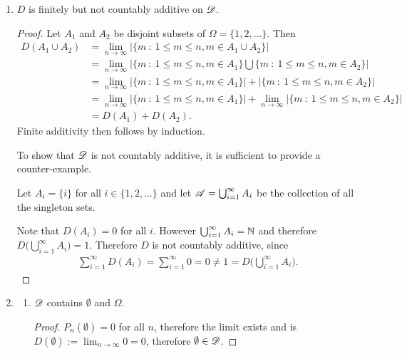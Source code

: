 \begin{enumerate}
  \begin{enumerate}[label=(\alph*)]

  \item
    \begin{claim*}
      $D$ is finitely but not countably additive on $\mathscr D$.
    \end{claim*}
    \begin{proof}
      Let $A_1$ and $A_2$ be disjoint subsets of $\Omega = \{1, 2, \ldots\}$. Then
      \begin{align*}
        D(A_1 \cup A_2)
        &= \lim_{n\to\infty} \big|\big\{m ~:~ 1 \leq m \leq n, m \in A_1 \cup A_2 \big\}\big| \\
        &= \lim_{n\to\infty} \big|\big\{m ~:~ 1 \leq m \leq n, m \in A_1 \big\} \bigcup \big\{m ~:~ 1 \leq m \leq n, m \in A_2 \big\}\big|\\
        &= \lim_{n\to\infty} \big|\big\{m ~:~ 1 \leq m \leq n, m \in A_1 \big\}\big| + \big|\big\{m ~:~ 1 \leq m \leq n, m \in A_2 \big\}\big| \\
        &= \lim_{n\to\infty} \big|\big\{m ~:~ 1 \leq m \leq n, m \in A_1 \big\}\big| + \lim_{n\to\infty} \big|\big\{m ~:~ 1 \leq m \leq n, m \in A_2 \big\}\big| \\
        &= D(A_1) + D(A_2).
      \end{align*}
      Finite additivity then follows by induction.

      To show that $\mathscr D$ is not countably additive, it is sufficient to provide a counter-example.

      Let $A_i = \{i\}$ for all $i \in \{1, 2, \ldots\}$ and let $\mathscr A = \bigcup_{i=1}^\infty A_i$ be the collection of all the singleton sets.

      Note that $D(A_i) = 0$ for all $i$. However $\bigcup_{i=1}^\infty A_i = \mathbb{N}$ and
      therefore $D\big(\bigcup_{i=1}^\infty A_i\big) = 1$. Therefore $D$ is not countably additive, since
      \begin{align*}
        \sum_{i=1}^\infty D(A_i) = \sum_{i=1}^\infty 0 = 0 \neq 1 = D\big(\bigcup_{i=1}^\infty A_i\big).
      \end{align*}
    \end{proof}

  \item
    \begin{enumerate}
    \item
      \begin{claim*}
        $\mathscr D$ contains $\emptyset$ and $\Omega$.
      \end{claim*}
      \begin{proof}
        $P_n(\emptyset) = 0$ for all $n$, therefore the limit exists and
        is $D(\emptyset) := \lim_{n\to\infty} 0 = 0$, therefore $\emptyset \in \mathscr D$.


\end{proof}
\end{enumerate}
\end{enumerate}
\end{enumerate}
